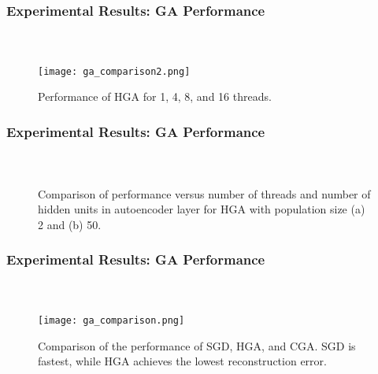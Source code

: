\begin{frame}[t]
	\frametitle{Experimental Results: GA Performance}
	\framesubtitle{~~}  %

	\begin{figure}[h] \centering
		\texttt{[image: ga\_comparison2.png]}
		\caption{Performance of HGA for 1, 4, 8, and 16 threads.}
		\label{fig:ga_comparison2}
	\end{figure}


\end{frame}


\begin{frame}[t]
	\frametitle{Experimental Results: GA Performance}
	\framesubtitle{~~}  %

\begin{figure}[H]
  \centering
  \caption{Comparison of performance versus number of threads and number of hidden units in autoencoder layer for HGA with population size (a) 2 and (b) 50.}
  \label{fig:ga_comparison3}
\end{figure}


\end{frame}


\begin{frame}[t]
	\frametitle{Experimental Results: GA Performance}
	\framesubtitle{~~}  %

\begin{figure}[h] \centering
  \texttt{[image: ga\_comparison.png]}
  \caption{Comparison of the performance of SGD, HGA, and CGA. SGD is fastest, while HGA achieves the lowest reconstruction error.}
  \label{fig:ga_comparison}
\end{figure}

\end{frame}
